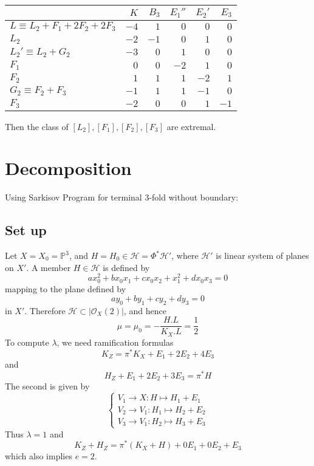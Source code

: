 \documentclass{article}
\begin{document}
\begin{center}
	\begin{tabular}{l|rrrrr}
		
		& $ K $ & $ B_3 $ &$ E_1'' $ & $ E_2' $&$ E_3 $ \\
		\hline
		
		$ L\equiv L_2 + F_1 + 2F_2 + 2F_3$ & $ -4 $ & $ 1 $ &$ 0 $&$ 0 $ &$ 0 $ \\
		
		$ L_2 $ & $ -2 $ & $ -1 $ &$ 0 $&$ 1 $ &$ 0 $ \\
		
		$ L_2'\equiv L_2+G_2 $ & $ -3 $ & $ 0 $ &$ 1 $&$ 0 $ &$ 0 $ \\
		
		$ F_1 $ & $ 0 $ & $ 0 $ &$ -2 $ &$ 1 $ &$ 0 $\\
		
		$ F_2 $ & $ 1 $ & $ 1 $ & $ 1 $&$ -2 $&$ 1 $ \\
		
		$ G_2\equiv F_2+F_3 $ & $ -1 $ & $ 1 $ & $ 1 $&$ -1 $&$ 0 $ \\
		
		$ F_3 $ & $ -2 $ & $ 0 $ & $ 0 $&$ 1 $&$ -1 $ \\
	\end{tabular}
\end{center}
Then the class of $ [L_2],[F_1],[F_2],[F_3] $ are extremal.
\section{Decomposition}
Using Sarkisov Program for terminal 3-fold without boundary:
\subsection{Set up}
Let $ X=X_0=\mathbb{P}^3 $, and $ H=H_0\in \mathcal{H}=\Phi^*\mathcal{H}' $, where $ \mathcal{H}' $ is linear system of planes on $ X' $. A member $ H\in \mathcal{H}$ is defined by
\[ ax_0^2+bx_0x_1+cx_0x_2+x_1^2+dx_0x_3=0 \]
mapping to the plane defined by
\[ ay_0+by_1+cy_2+dy_3=0 \]
in $ X' $. Therefore $ \mathcal{H}\subset |\mathcal{O}_X(2)| $, and hence
\[ \mu=\mu_0=-\frac{H.L}{K_X.L}=\frac{1}{2} \]
To compute $ \lambda $, we need ramification formulas
\[ K_Z=\pi^*K_X+E_1+2E_2+4E_3 \]
and
\[ H_Z+E_1+2E_2+3E_3=\pi^*H \]
The second is given by
\[ \begin{cases}
	V_1\to X: H\mapsto H_1+E_1\\
	V_2\to V_1: H_1 \mapsto H_2+E_2\\
	V_3\to V_1: H_2\mapsto H_3+E_3
\end{cases} \]
Thus $ \lambda =1 $ and
\[ K_Z+H_Z=\pi^*(K_X+H)+0E_1+0E_2+E_3 \]
which also implies $ e=2 $.
\end{document}
